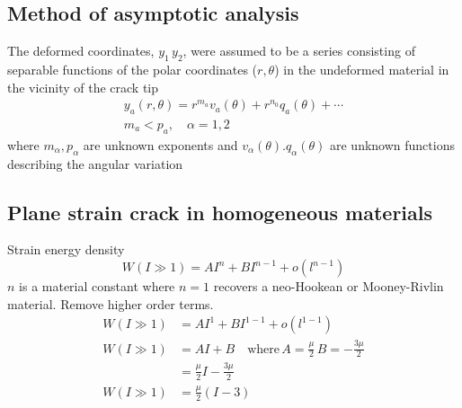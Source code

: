 \documentclass[12pt,3p]{article}
\numberwithin{equation}{section}
\begin{document}
\subsection{Method of asymptotic analysis}
The deformed coordinates, $y_1 \, y_2$, were assumed to be a series consisting of separable functions of the polar coordinates ($r, \theta$) in the undeformed material in the vicinity of the crack tip 
\begin{equation}
\begin{array}{l}
y_{a}(r, \theta)=r^{m_{a}} v_{a}(\theta)+r^{n_{0}} q_{a}(\theta)+\cdots \\
m_{a}<p_{a}, \quad \alpha=1,2
\end{array}
\end{equation}
where $m_\alpha, p_\alpha$ are unknown exponents and $v_\alpha (\theta). q_\alpha (\theta)$ are unknown functions describing the angular variation

\subsection{Plane strain crack in homogeneous materials}
Strain energy density 
\begin{equation}
W(I \gg 1)=A I^{n}+B I^{n-1}+o\left(l^{n-1}\right)
\end{equation}
$n$ is a material constant where $n = 1$ recovers a neo-Hookean or Mooney-Rivlin material. Remove higher order terms. 
\begin{align*}
W(I \gg 1) &=A I^{1} + B I^{1-1} + o (l^{1-1}) \\
W(I \gg 1) &=A I + B \quad \text{where} \, A = \frac{\mu}{2} \, B = - \frac{3 \mu}{2} \\
		&= \frac{\mu}{2} I - \frac{3 \mu}{2} \\
W(I \gg 1) &= \frac{\mu}{2} (I - 3)
\end{align*}

\end{document}
